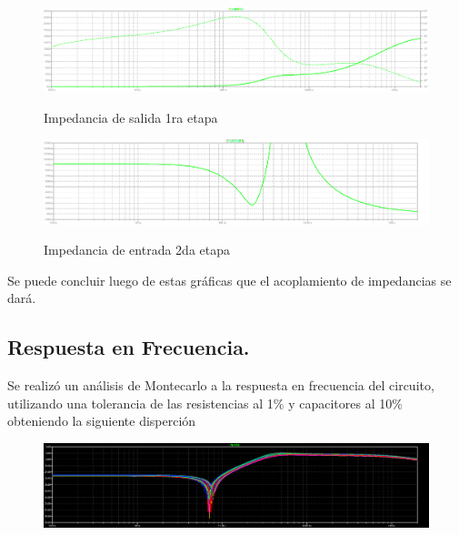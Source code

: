\begin{figure}[H]
	\centering
	\includegraphics[width=\textwidth]{Imagenes-Ej3/ZoutE1.png}
	\label{fig:stepresponse}
	\caption{Impedancia de salida 1ra etapa}
\end{figure}

\begin{figure}[H]
	\centering
	\includegraphics[width=\textwidth]{Imagenes-Ej3/ZinE2.png}
	\label{fig:stepresponse}
	\caption{Impedancia de entrada 2da etapa}
\end{figure}
Se puede concluir luego de estas gráficas que el acoplamiento de impedancias se dará.
\subsection{Respuesta en Frecuencia.}
Se realizó un análisis de Montecarlo a la respuesta en frecuencia del circuito, utilizando una tolerancia de las resistencias al 1$\%$ y capacitores al 10$\%$ obteniendo la siguiente disperción
\begin{figure}[H]
	\centering
	\includegraphics[width=\textwidth]{Imagenes-Ej3/mcsedra.png}
	\label{fig:mcsedra}
\end{figure}

